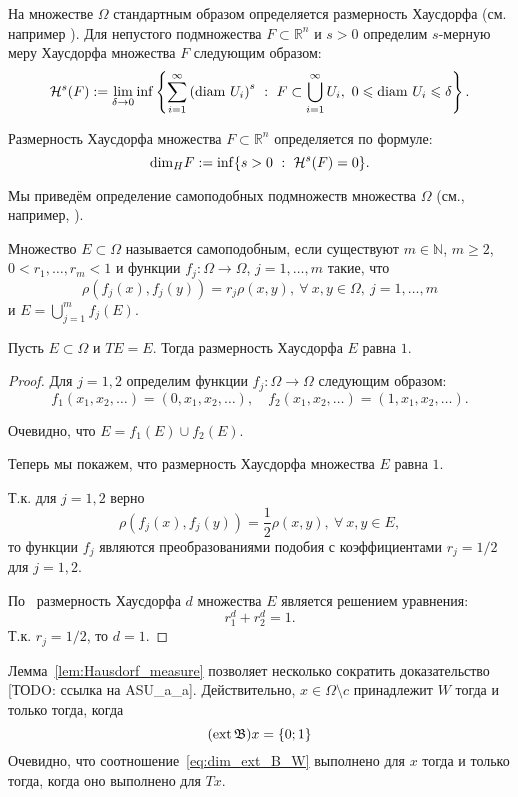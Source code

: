 На множестве $\Omega$ стандартным образом определяется размерность Хаусдорфа (см. например \cite[Секция 6]{Edgar}).
Для непустого подмножества $F\subset \mathbb R^n$ и $s > 0$ определим $s$-мерную меру Хаусдорфа множества $F$ следующим образом:
$$\mathcal H^s(F) := \lim_{\delta\to0} \inf \left\{\sum_{i=1}^\infty \left({\rm diam} \ U_i \right)^s \ : \ F\subset \bigcup_{i=1}^\infty  U_i, \  0\leqslant {\rm diam} \ U_i \leqslant \delta \right\}.$$

Размерность Хаусдорфа множества  $F\subset \mathbb R^n$ определяется по формуле:
$${\rm dim}_H F := \inf\{ s > 0 \ : \ \mathcal H^s(F)=0\}.$$



Мы приведём определение самоподобных подмножеств множества $\Omega$ (см., например, \cite{falconer1997techniques}).

\begin{definition}
Множество $E\subset\Omega$ называется самоподобным, если существуют $m\in\mathbb{N}$,
$m\geqslant2$, $0< r_1, \dots, r_m<1$ и функции $f_j : \Omega \to \Omega$, $j=1,\dots, m$ такие, что
$$\rho(f_j(x), f_j(y)) = r_j \rho(x,y), \ \forall \ x,y \in \Omega, \ j=1,\dots, m$$
и $E=\bigcup_{j=1}^m f_j(E).$
\end{definition}



\begin{lemma}
	\label{lem:Hausdorf_measure}
	Пусть $E\subset\Omega$ и $TE = E$.
	Тогда размерность Хаусдорфа $E$ равна $1$.
\end{lemma}

\begin{proof}
	Для $j=1,2$ определим функции $f_j : \Omega \to \Omega$ следующим образом:
	$$f_1(x_1, x_2, \dots)=(0, x_1, x_2, \dots), \quad f_2(x_1, x_2, \dots)=(1, x_1, x_2, \dots).$$

	Очевидно, что $E=f_1(E)\cup f_2(E).$

	Теперь мы покажем, что размерность Хаусдорфа множества $E$ равна $1$.

	Т.к. для $j=1,2$ верно
	 $$\rho(f_j(x),f_j(y))=\frac12\rho(x,y), \ \forall \ x, y \in E,$$
	 то функции $f_j$ являются преобразованиями подобия с коэффициентами $r_j=1/2$ для $j=1,2$.


	По~\cite[Теорема 9.3]{Edgar} размерность Хаусдорфа $d$ множества $E$ является решением уравнения:
	$$ r_1^d+r_2^d=1.$$
	Т.к. $r_j=1/2$, то
	$d=1.$
\end{proof}

Лемма~\ref{lem:Hausdorf_measure} позволяет несколько сократить доказательство
[ТОDO: ссылка на ASU\_a\_a].
Действительно, $x\in\Omega\setminus c$ принадлежит $W$ тогда и только тогда, когда
\begin{equation}
	\label{eq:dim_ext_B_W}
	(\ext \mathfrak{B})x = \{0;1\}
\end{equation}
Очевидно, что соотношение~\eqref{eq:dim_ext_B_W} выполнено для $x$ тогда и только тогда, когда оно выполнено для $Tx$.






